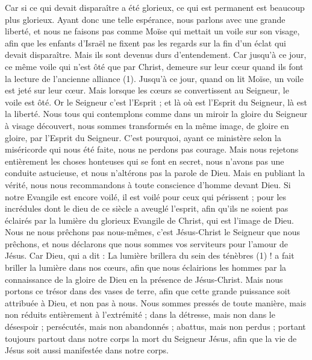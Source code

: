 \begin{multicols}{2}
Car si ce qui devait disparaître a été glorieux, ce qui est permanent est beaucoup plus glorieux.
Ayant donc une telle espérance, nous parlons avec une grande liberté,
et nous ne faisons pas comme Moïse qui mettait un voile sur son visage, afin que les enfants d'Israël ne fixent pas les regards sur la fin d’un éclat qui devait disparaître.
Mais ils sont devenus durs d’entendement. Car jusqu'à ce jour, ce même voile qui n’est ôté que par Christ, demeure sur leur cœur quand ils font la lecture de l'ancienne alliance (1).
Jusqu'à ce jour, quand on lit Moïse, un voile est jeté sur leur cœur.
Mais lorsque les cœurs se convertissent au Seigneur, le voile est ôté.
Or le Seigneur c’est l’Esprit ; et là où est l'Esprit du Seigneur, là est la liberté.
Nous tous qui contemplons comme dans un miroir la gloire du Seigneur à visage découvert, nous sommes transformés en la même image, de gloire en gloire, par l'Esprit du Seigneur.
\VerseOne{}C'est pourquoi, ayant ce ministère selon la miséricorde qui nous été faite, nous ne perdons pas courage.
Mais nous rejetons entièrement les choses honteuses qui se font en secret, nous n’avons pas une conduite astucieuse, et nous n’altérons pas la parole de Dieu. Mais en publiant la vérité, nous nous recommandons à toute conscience d’homme devant Dieu.
Si notre Evangile est encore voilé, il est voilé pour ceux qui périssent ;
pour les incrédules dont le dieu de ce siècle a aveuglé l’esprit, afin qu’ils ne soient pas éclairés par la lumière du glorieux Evangile de Christ, qui est l'image de Dieu.
Nous ne nous prêchons pas nous-mêmes, c’est Jésus-Christ le Seigneur que nous prêchons, et nous déclarons que nous sommes vos serviteurs pour l'amour de Jésus.
Car Dieu, qui a dit : La lumière brillera du sein des ténèbres (1) ! a fait briller la lumière dans nos cœurs, afin que nous éclairions les hommes par la connaissance de la gloire de Dieu en la présence de Jésus-Christ.
Mais nous portons ce trésor dans des vases de terre, afin que cette grande puissance soit attribuée à Dieu, et non pas à nous.
Nous sommes pressés de toute manière, mais non réduits entièrement à l’extrémité ; dans la détresse, mais non dans le désespoir ;
persécutés, mais non abandonnés ; abattus, mais non perdus ;
portant toujours partout dans notre corps la mort du Seigneur Jésus, afin que la vie de Jésus soit aussi manifestée dans notre corps.

\end{multicols}
